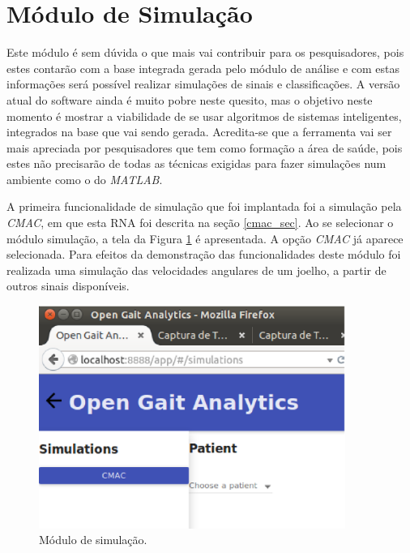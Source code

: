 \section{Módulo de Simulação}
Este módulo é sem dúvida o que mais vai contribuir para os pesquisadores, pois estes contarão com a base integrada gerada pelo módulo de análise e com estas informações será possível realizar simulações de sinais e classificações. 
A versão atual do software ainda é muito pobre neste quesito, mas o objetivo neste momento é mostrar a viabilidade de se usar algoritmos de sistemas inteligentes, integrados na base que vai sendo gerada.
Acredita-se que a ferramenta vai ser mais apreciada por pesquisadores que tem como formação a área de saúde, pois estes não precisarão de todas as técnicas exigidas para fazer simulações num ambiente como o do \emph{MATLAB}.

A primeira funcionalidade de simulação que foi implantada foi a simulação pela \emph{CMAC}, em que esta RNA foi descrita na seção \ref{cmac_sec}. 
Ao se selecionar o módulo simulação, a tela da Figura \ref{tela27} é apresentada. 
A opção \emph{CMAC} já aparece selecionada. 
Para efeitos da demonstração das funcionalidades deste módulo foi realizada uma simulação das velocidades angulares de um joelho, a partir de outros sinais disponíveis.

\begin{figure}[H]
	\centering
	\includegraphics[width=10cm]{figuras/tela27.eps}
	\caption{Módulo de simulação.}
\label{tela27}
\end{figure}


